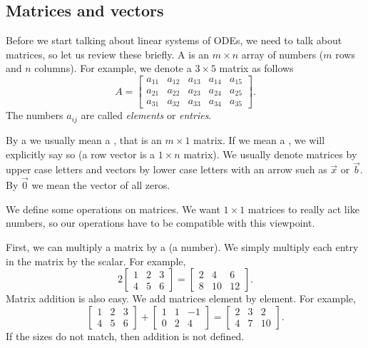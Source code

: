 \subsection{Matrices and vectors}

Before we start talking about linear systems of ODEs, we need to
talk about matrices, so let us review these briefly.  A \emph{}
is an $m
\times n$ array of numbers ($m$ rows and $n$ columns).  For example, we denote
a $3 \times 5$ matrix as follows
\begin{equation*}
A = 
\begin{bmatrix}
a_{11} & a_{12} & a_{13} & a_{14} & a_{15} \\
a_{21} & a_{22} & a_{23} & a_{24} & a_{25} \\
a_{31} & a_{32} & a_{33} & a_{34} & a_{35}
\end{bmatrix} .
\end{equation*}
The numbers $a_{ij}$ are called \emph{elements}
or \emph{entries}.

By a \emph{} we usually mean a
\emph{}, that is an $m \times 1$ matrix.
If we mean a \emph{},
we will explicitly say so (a row vector is a $1 \times n$ matrix).
We usually denote
matrices by upper case letters and vectors by lower case letters with an
arrow such as $\vec{x}$ or $\vec{b}$.  By $\vec{0}$ we mean the vector
of all zeros.

We define some operations on matrices.  We 
want $1 \times 1$ matrices to really act like numbers, so our operations
have to be compatible with this viewpoint.

First, we can multiply a matrix by
a \emph{} (a number).
We simply multiply each entry in the matrix by the scalar.  For example,
\begin{equation*}
2
\begin{bmatrix}
1 & 2 & 3 \\
4 & 5 & 6
\end{bmatrix} =
\begin{bmatrix}
2 & 4 & 6 \\
8 & 10 & 12
\end{bmatrix} .
\end{equation*}
Matrix addition is also easy.
We add matrices element by element.
For example,
\begin{equation*}
\begin{bmatrix}
1 & 2 & 3 \\
4 & 5 & 6
\end{bmatrix} +
\begin{bmatrix}
1 & 1 & -1 \\
0 & 2 & 4
\end{bmatrix}
=
\begin{bmatrix}
2 & 3 & 2 \\
4 & 7 & 10
\end{bmatrix} .
\end{equation*}
If the sizes do not match, then addition is not defined.


